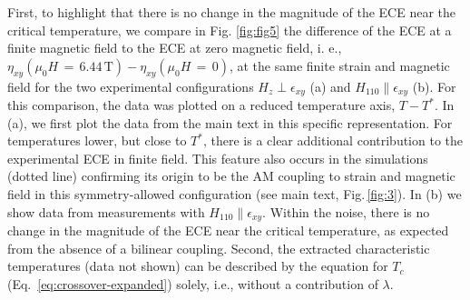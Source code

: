 \documentclass[
 reprint,










 amsmath,amssymb,
 aps,






]{revtex4-2}
\begin{document}
First, to highlight that there is no change in the magnitude of the ECE near the critical temperature, we compare in Fig. \ref{fig:fig5} the difference of the ECE at a finite magnetic field to the ECE at zero magnetic field, i. e., $\eta_{xy} (\mu_0H\,=\,6.44\,\mathrm{T})-\eta_{xy} (\mu_0H\,=\,0)$, at the same finite strain and magnetic field for the two experimental configurations $H_z\perp\epsilon_{xy}$ (a) and $H_{110}\parallel\epsilon_{xy}$ (b). For this comparison, the data was plotted on a reduced temperature axis, $T-T^*$. In (a), we first plot the data from the main text in this specific representation. For temperatures lower, but close to $T^*$, there is a clear additional contribution to the experimental ECE in finite field. This feature also occurs in the simulations (dotted line) confirming its origin to be the AM coupling to strain and magnetic field in this symmetry-allowed configuration (see main text, Fig.\,\ref{fig:3}). In (b) we show data from measurements with $H_{110}\parallel\epsilon_{xy}$. Within the noise, there is no change in the magnitude of the ECE near the critical temperature, as expected from the absence of a bilinear coupling. Second, the extracted characteristic temperatures (data not shown) can be described by the equation for $T_c$ (Eq.~\eqref{eq:crossover-expanded}) solely, i.e., without a contribution of $\lambda$.
\end{document}
